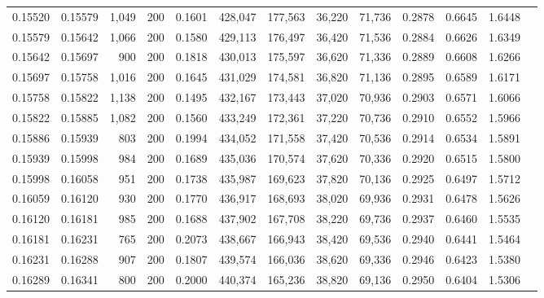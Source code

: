 \begin{tabular}{rrrrrrrrrrrrr}
0.15520 & 0.15579 &  1,049 & 200 &                                     0.1601 & 428,047 & 177,563 &  36,220 &  71,736 & 0.2878 & 0.6645 & 1.6448 \\
0.15579 & 0.15642 &  1,066 & 200 &                                     0.1580 & 429,113 & 176,497 &  36,420 &  71,536 & 0.2884 & 0.6626 & 1.6349 \\
0.15642 & 0.15697 &    900 & 200 &                                     0.1818 & 430,013 & 175,597 &  36,620 &  71,336 & 0.2889 & 0.6608 & 1.6266 \\
0.15697 & 0.15758 &  1,016 & 200 &                                     0.1645 & 431,029 & 174,581 &  36,820 &  71,136 & 0.2895 & 0.6589 & 1.6171 \\
0.15758 & 0.15822 &  1,138 & 200 &                                     0.1495 & 432,167 & 173,443 &  37,020 &  70,936 & 0.2903 & 0.6571 & 1.6066 \\
0.15822 & 0.15885 &  1,082 & 200 &                                     0.1560 & 433,249 & 172,361 &  37,220 &  70,736 & 0.2910 & 0.6552 & 1.5966 \\
0.15886 & 0.15939 &    803 & 200 &                                     0.1994 & 434,052 & 171,558 &  37,420 &  70,536 & 0.2914 & 0.6534 & 1.5891 \\
0.15939 & 0.15998 &    984 & 200 &                                     0.1689 & 435,036 & 170,574 &  37,620 &  70,336 & 0.2920 & 0.6515 & 1.5800 \\
0.15998 & 0.16058 &    951 & 200 &                                     0.1738 & 435,987 & 169,623 &  37,820 &  70,136 & 0.2925 & 0.6497 & 1.5712 \\
0.16059 & 0.16120 &    930 & 200 &                                     0.1770 & 436,917 & 168,693 &  38,020 &  69,936 & 0.2931 & 0.6478 & 1.5626 \\
0.16120 & 0.16181 &    985 & 200 &                                     0.1688 & 437,902 & 167,708 &  38,220 &  69,736 & 0.2937 & 0.6460 & 1.5535 \\
0.16181 & 0.16231 &    765 & 200 &                                     0.2073 & 438,667 & 166,943 &  38,420 &  69,536 & 0.2940 & 0.6441 & 1.5464 \\
0.16231 & 0.16288 &    907 & 200 &                                     0.1807 & 439,574 & 166,036 &  38,620 &  69,336 & 0.2946 & 0.6423 & 1.5380 \\
0.16289 & 0.16341 &    800 & 200 &                                     0.2000 & 440,374 & 165,236 &  38,820 &  69,136 & 0.2950 & 0.6404 & 1.5306 \\

\end{tabular}
